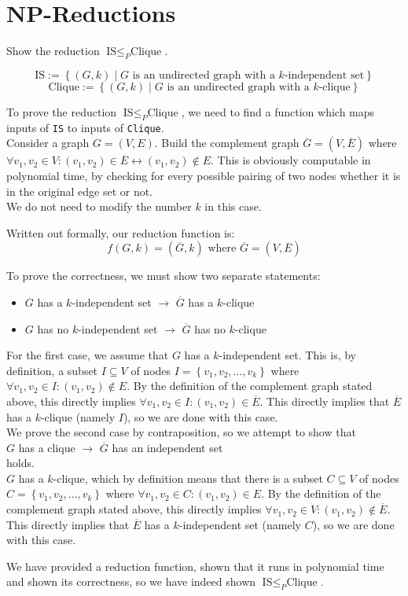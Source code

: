 



\section{\textsc{NP}-Reductions}

Show the reduction $\text{IS}\leq_{P}\text{Clique}$.

$$\text{IS}:=\left\{(G,k)\mid G\text{ is an undirected graph with a }k\text{-independent set}\right\}$$
$$\text{Clique}:=\left\{(G,k)\mid G\text{ is an undirected graph with a }k\text{-clique}\right\}$$

To prove the reduction $\text{IS}\leq_{P}\text{Clique}$, we need to find a function which maps inputs of \texttt{IS} to inputs of \texttt{Clique}.\\
Consider a graph $G = (V,E)$. Build the complement graph $\overline{G} = (V, \overline{E})$ where $\forall v_{1}, v_{2} \in V: (v_{1},v_{2}) \in \overline{E} \leftrightarrow (v_{1},v_{2}) \notin E$. This is obviously computable in polynomial time, by checking for every possible pairing of two nodes whether it is in the original edge set or not.\\
We do not need to modify the number $k$ in this case.

Written out formally, our reduction function is:
$$f(G,k) = (\overline{G},k)\text{ where }\overline{G}=(V,\overline{E})$$

To prove the correctness, we must show two separate statements:
\begin{itemize}
    \item $G$ has a $k$-independent set $\rightarrow$ $\overline{G}$ has a $k$-clique
    \item $G$ has no $k$-independent set $\rightarrow$ $\overline{G}$ has no $k$-clique
\end{itemize}
For the first case, we assume that $G$ has a $k$-independent set. This is, by definition, a subset $I\subseteq V$ of nodes $I = \left\{v_{1}, v_{2}, \ldots, v_{k}\right\}$ where $\forall v_{1},v_{2} \in I: (v_{1},v_{2})\notin E$. By the definition of the complement graph stated above, this directly implies $\forall v_{1},v_{2} \in I: (v_{1},v_{2})\in \overline{E}$. This directly implies that $\overline{E}$ has a $k$-clique (namely $I$), so we are done with this case.\\
We prove the second case by contraposition, so we attempt to show that\\
\phantom{x}\hspace{0.4cm}$G$ has a clique $\rightarrow$ $\overline{G}$ has an independent set\\
holds.\\
$G$ has a $k$-clique, which by definition means that there is a subset $C\subseteq V$ of nodes $C = \left\{v_{1}, v_{2}, \ldots, v_{k}\right\}$ where $\forall v_{1},v_{2} \in C: (v_{1},v_{2})\in E$. By the definition of the complement graph stated above, this directly implies $\forall v_{1},v_{2} \in V: (v_{1},v_{2})\notin \overline{E}$. This directly implies that $\overline{E}$ has a $k$-independent set (namely $C$), so we are done with this case.

We have provided a reduction function, shown that it runs in polynomial time and shown its correctness, so we have indeed shown $\text{IS}\leq_{P}\text{Clique}$.



